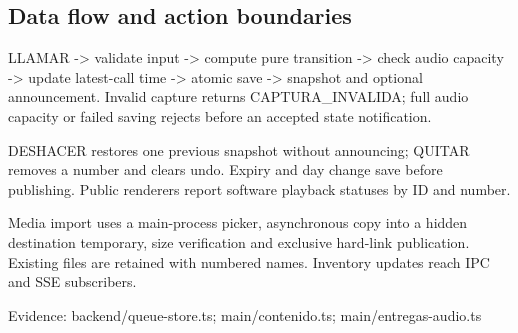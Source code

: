 \subsection{Data flow and action boundaries}

LLAMAR -> validate input -> compute pure transition -> check audio capacity -> update latest-call time -> atomic save -> snapshot and optional announcement. Invalid capture returns CAPTURA\_INVALIDA; full audio capacity or failed saving rejects before an accepted state notification.

DESHACER restores one previous snapshot without announcing; QUITAR removes a number and clears undo. Expiry and day change save before publishing. Public renderers report software playback statuses by ID and number.

Media import uses a main-process picker, asynchronous copy into a hidden destination temporary, size verification and exclusive hard-link publication. Existing files are retained with numbered names. Inventory updates reach IPC and SSE subscribers.

Evidence: backend/queue-store.ts; main/contenido.ts; main/entregas-audio.ts
